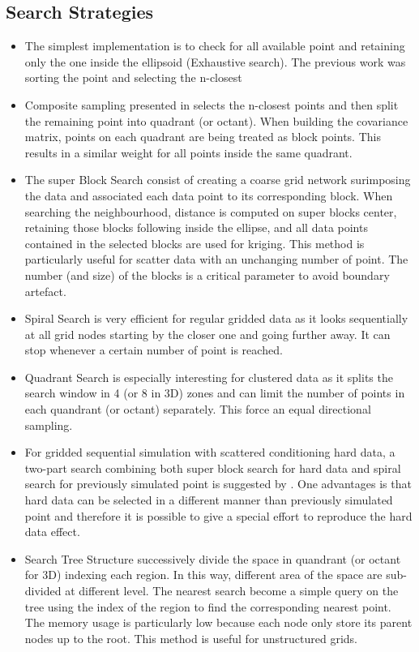 \documentclass[twocolumn]{article}
\numberwithin{equation}{section}
\begin{document}
\subsection{Search Strategies}
\begin{itemize}
\item The simplest implementation is to check for all available point and retaining only the one inside the ellipsoid (Exhaustive search).
The previous work was sorting the point and selecting the n-closest \citep{Ruggeri2013}
\item Composite sampling presented in \citep{isaaks1989introduction} selects the n-closest points and then split the remaining point into quadrant (or octant). When building the covariance matrix, points on each quadrant are being treated as block points. This results in a similar weight for all points inside the same quadrant.
\item The super Block Search \citep{deutsch1998gslib,Lyster2008} consist of creating a coarse grid network surimposing the data and associated each data point to its corresponding block. When searching the neighbourhood, distance is computed on super blocks center, retaining those blocks following inside the ellipse, and all data points contained in the selected blocks are used for kriging. This method is particularly useful for scatter data with an unchanging number of point. The number (and size) of the blocks is a critical parameter to avoid boundary artefact.
\item Spiral Search \citep{deutsch1998gslib} is very efficient for regular gridded data as it looks sequentially at all grid nodes starting by the closer one and going further away. It can stop whenever a certain number of point is reached.
\item Quadrant Search is especially interesting for clustered data as it splits the search window in 4 (or 8 in 3D) zones and can limit the number of points in each quandrant (or octant) separately. This force an equal directional sampling.
\item For gridded sequential simulation with scattered conditioning hard data, a two-part search combining both super block search for hard data and spiral search for previously simulated point is suggested by \cite{deutsch1998gslib}. One advantages is that hard data can be selected in a different manner than previously simulated point and therefore it is possible to give a special effort to reproduce the hard data effect.
\item Search Tree Structure \citep{Manchuk2004} successively divide the space in quandrant (or octant for 3D) indexing each region. In this way, different area of the space are sub-divided at different level. The nearest search become a simple query on the tree using the index of the region to find the corresponding nearest point. The memory usage is particularly low because each node only store its parent nodes up to the root. This method is useful for unstructured grids.
\end{itemize}
\end{document}
